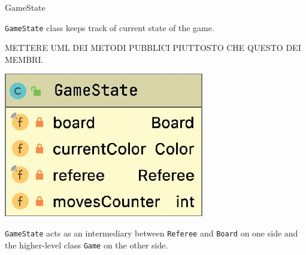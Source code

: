 \documentclass{beamer}
\begin{document}
\begin{frame}{GameState}
     
     \texttt{GameState} class keeps track of current state of the game.
     
     METTERE UML DEI METODI PUBBLICI PIUTTOSTO CHE QUESTO DEI MEMBRI.
     \begin{center}
     	\includegraphics[scale=0.32]{images/gamestate.png}
     \end{center}
    
     \vspace{0.4cm}
   \texttt{GameState} acts as an intermediary between \texttt{Referee} and \texttt{Board} on one side and the higher-level class \texttt{Game} on the other 	side.
     
\end{frame}
\end{document}

